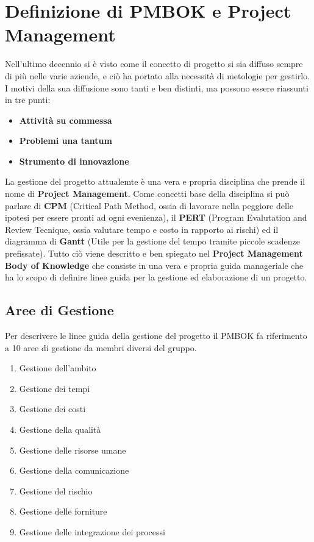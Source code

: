 \documentclass{article}
\begin{document}
\section{Definizione di PMBOK e Project Management}
Nell'ultimo decennio si è visto come il concetto di progetto si sia diffuso sempre di più nelle varie aziende, e ciò ha portato alla necessità di metologie per gestirlo.
I motivi della sua diffusione sono tanti e ben distinti, ma possono essere riassunti in tre punti:
\begin{itemize}
    \item \textbf{Attività su commessa}
    \item \textbf{Problemi una tantum}
    \item \textbf{Strumento di innovazione}
\end{itemize}
La gestione del progetto attualemte è una vera e propria disciplina che prende il nome di \textbf{Project Management}.
Come concetti base della disciplina si può parlare di \textbf{CPM} (Critical Path Method, ossia di lavorare nella peggiore delle ipotesi per essere pronti ad ogni evenienza), il \textbf{PERT} (Program Evalutation and Review Tecnique, ossia valutare tempo e costo in rapporto ai rischi) ed il diagramma di \textbf{Gantt} (Utile per la gestione del tempo tramite piccole scadenze prefissate).
Tutto ciò viene descritto e ben spiegato nel \textbf{Project Management Body of Knowledge} che consiste in una vera e propria guida manageriale che ha lo scopo di definire linee guida per la gestione ed elaborazione di un progetto.

\subsection{Aree di Gestione}
Per descrivere le linee guida della gestione del progetto il PMBOK fa riferimento a 10 aree di gestione da membri diversi del gruppo.
\begin{enumerate}
    \item Gestione dell'ambito
    \item Gestione dei tempi
    \item Gestione dei costi
    \item Gestione della qualità
    \item Gestione delle risorse umane
    \item Gestione della comunicazione
    \item Gestione del rischio
    \item Gestione delle forniture
    \item Gestione delle integrazione dei processi
\end{enumerate}
\end{document}
